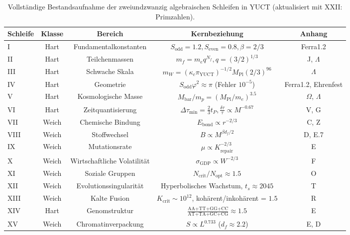 \documentclass[12pt,a4paper]{article}
\begin{document}
	\begin{table}[htbp]
		\centering
		\caption{Vollständige Bestandsaufnahme der zweiundzwanzig algebraischen Schleifen in YUCT (aktualisiert mit XXII: Primzahlen).}
		\label{tab:all-loops-22}
		\footnotesize
		\begin{tabular}{l c c c c}
			\toprule
			\textbf{Schleife} & \textbf{Klasse} & \textbf{Bereich} & \textbf{Kernbeziehung} & \textbf{Anhang} \\
			\midrule
			I   & Hart & Fundamentalkonstanten & \(S_{\mathrm{odd}}=1.2, S_{\mathrm{even}}=0.8, \beta=2/3\) & Ferra1.2 \\
			II  & Hart & Teilchenmassen & \(m_f = m_e q^{N_f}, q=(3/2)^{1/3}\) & J, \(\Lambda\) \\
			III & Hart & Schwache Skala & \(m_W = (\kappa_c \pi_{\mathrm{YUCT}})^{-1/2} M_{\mathrm{Pl}} (2/3)^{96}\) & \(\Lambda\) \\
			IV  & Hart & Geometrie & \(S_{\mathrm{odd}}\varphi^2 \approx \pi\) (Fehler \(10^{-5}\)) & Ferra1.2, Ehrenfest \\
			V   & Hart & Kosmologische Masse & \(M_{\mathrm{bar}}/m_p = (M_{\mathrm{Pl}}/m_e)^{3.5}\) & \(\Omega\), \(\Lambda\) \\
			VI  & Hart & Zeitquantisierung & \(\Delta\tau_{\min} = \frac{2}{3}t_P, \frac{\delta\tau}{\tau} \propto M^{-0.67}\) & V, G \\
			VII & Weich & Chemische Bindung & \(E_{\mathrm{bond}} \propto r^{-2/3}\) & C, Z \\
			VIII& Weich & Stoffwechsel & \(B \propto M^{\beta d_f/2}\) & D, E.7 \\
			IX  & Weich & Mutationsrate & \(\mu \propto K_{\mathrm{repair}}^{-2/3}\) & E \\
			X   & Weich & Wirtschaftliche Volatilität & \(\sigma_{\mathrm{GDP}} \propto W^{-2/3}\) & F \\
			XI  & Weich & Soziale Gruppen & \(N_{\mathrm{crit}}/N_{\mathrm{opt}} \approx 1.5\) & O \\
			XII & Weich & Evolutionssingularität & Hyperbolisches Wachstum, \(t_s \approx 2045\) & T \\
			XIII& Weich & Kalte Fusion & \(K_{\mathrm{crit}} \sim 10^{12}\), kohärent/inkohärent = \(1.5\) & R \\
			XIV & Hart & Genomstruktur & \(\frac{\text{AA+TT+GG+CC}}{\text{AT+TA+GC+CG}} \approx 1.5\) & E \\
			XV  & Weich & Chromatinverpackung & \(S \propto L^{0.733}\) (\(d_f \approx 2.2\)) & E, D \\

\end{tabular}
\end{table}
\end{document}
